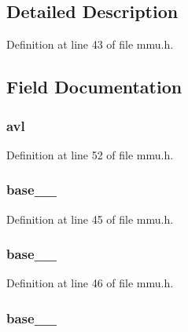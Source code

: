 \subsection{Detailed Description}


Definition at line 43 of file mmu.\-h.



\subsection{Field Documentation}
\hypertarget{structsegdesc_a3fe31ffafb8c060bbfce5cc88bc4a7c3}{
\subsubsection[{avl}]{ avl}}\label{structsegdesc_a3fe31ffafb8c060bbfce5cc88bc4a7c3}


Definition at line 52 of file mmu.\-h.

\hypertarget{structsegdesc_a5b20f16107a37790349fb5c3856c6c01}{
\subsubsection[{base\-\_\-15\-\_\-0}]{ base\-\_\-\_}}\label{structsegdesc_a5b20f16107a37790349fb5c3856c6c01}


Definition at line 45 of file mmu.\-h.

\hypertarget{structsegdesc_a80d2085d2e280c3bbd1420fb452680e2}{
\subsubsection[{base\-\_\-23\-\_\-16}]{ base\-\_\-\_}}\label{structsegdesc_a80d2085d2e280c3bbd1420fb452680e2}


Definition at line 46 of file mmu.\-h.

\hypertarget{structsegdesc_aa4e2821f8c7d1fb00ed552f59d07f59a}{
\subsubsection[{base\-\_\-31\-\_\-24}]{ base\-\_\-\_}}\label{structsegdesc_aa4e2821f8c7d1fb00ed552f59d07f59a}


